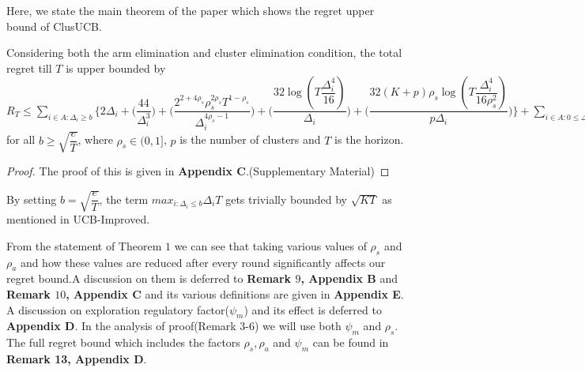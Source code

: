 	
	Here, we state the main theorem of the paper which shows the regret upper bound of ClusUCB.
	
\begin{theorem}
Considering both the arm elimination and cluster elimination condition, the total regret till $T$ is upper bounded by $R_{T}\leq \sum_{i\in A:\Delta_{i}\geq b} \bigg\lbrace 2\Delta_{i}+ \bigg(\dfrac{44}{\Delta_{i}^{3}}\bigg) + \bigg(\dfrac{2^{2+4\rho_{s}}\rho_{s}^{2\rho_{s}}T^{1-\rho_{s}}}{\Delta_{i}^{4\rho_{s}-1}}\bigg) + \bigg(\dfrac{32\log{(T\dfrac{\Delta_{i}^{4}}{16})}}{\Delta_{i}}\bigg) + \bigg(\dfrac{32(K+p)\rho_{s}\log{(T\dfrac{\Delta_{i}^{4}}{16\rho_{s}^{2}})}}{p\Delta_{i}}\bigg)\bigg\rbrace + \sum_{i\in A:0\leq\Delta_{i}\leq b}\bigg\lbrace \bigg(\dfrac{12}{b^{3}} \bigg) + \bigg(\dfrac{T^{1-\rho_{s}}\rho_{s}^{2\rho_{s}}2^{2\rho_{s}+3}}{\Delta_{i}^{4\rho_{s}-1}} \bigg)+\bigg(\dfrac{T^{1-\rho_{s}}\rho_{s}^{2\rho_{s}}2^{2\rho_{s}+3}}{b^{4\rho_{s} -1}} \bigg) \bigg\rbrace + max_{i:\Delta_{i}\leq b}\Delta_{i}T $ for all $b\geq \sqrt{\dfrac{e}{T}}$, where $\rho_{s}\in (0,1]$, $p$ is the number of clusters and $T$ is the horizon.
\end{theorem}

\begin{proof}
	The proof of this is given in \textbf{Appendix C}.(Supplementary Material)
\end{proof}

\begin{remark}
By setting $b=\sqrt{\dfrac{e}{T}}$, the term $max_{i:\Delta_{i}\leq b}\Delta_{i}T$ gets trivially bounded by $\sqrt{KT}$ as mentioned in UCB-Improved.
\end{remark}

\begin{remark}
From the statement of Theorem $1$ we can see that taking various values of $\rho_{s}$ and $\rho_{a}$ and how these values are reduced after every round significantly affects our regret bound.A discussion on them is deferred to \textbf{Remark $9$, Appendix B} and \textbf{Remark $10$, Appendix C} and its various definitions are given in \textbf{Appendix E}. A discussion on exploration regulatory factor($\psi_{m}$) and its effect is deferred to \textbf{Appendix D}. In the analysis of proof(Remark $3$-$6$) we will use both $\psi_{m}$ and $\rho_{s}$. The full regret bound which includes the factors $\rho_{s},\rho_{a}$ and $\psi_{m}$ can be found in \textbf{Remark 13, Appendix D}.
\end{remark}


